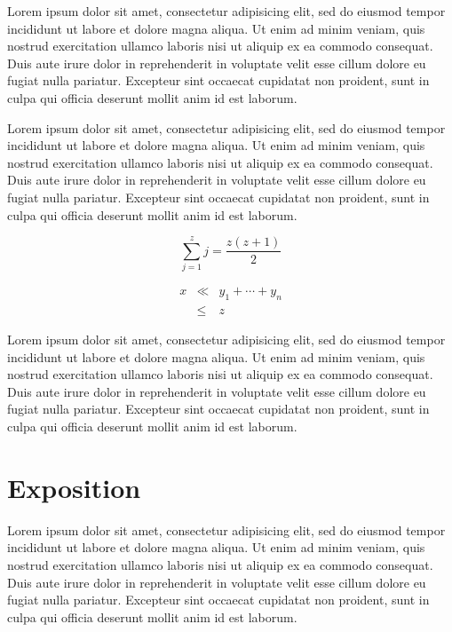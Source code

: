 \documentclass[annual]{acmsiggraph}
\begin{document}
Lorem ipsum dolor sit amet, consectetur adipisicing elit, sed do
eiusmod tempor incididunt ut labore et dolore magna aliqua. Ut enim ad
minim veniam, quis nostrud exercitation ullamco laboris nisi ut
aliquip ex ea commodo consequat. Duis aute irure dolor in
reprehenderit in voluptate velit esse cillum dolore eu fugiat nulla
pariatur. Excepteur sint occaecat cupidatat non proident, sunt in
culpa qui officia deserunt mollit anim id est laborum.

Lorem ipsum dolor sit amet, consectetur adipisicing elit, sed do
eiusmod tempor incididunt ut labore et dolore magna aliqua. Ut enim ad
minim veniam, quis nostrud exercitation ullamco laboris nisi ut
aliquip ex ea commodo consequat. Duis aute irure dolor in
reprehenderit in voluptate velit esse cillum dolore eu fugiat nulla
pariatur. Excepteur sint occaecat cupidatat non proident, sunt in
culpa qui officia deserunt mollit anim id est laborum.

\begin{equation}
 \sum_{j=1}^{z} j = \frac{z(z+1)}{2}
\end{equation}

\begin{eqnarray}
x & \ll & y_{1} + \cdots + y_{n} \\
  & \leq & z
\end{eqnarray}

Lorem ipsum dolor sit amet, consectetur adipisicing elit, sed do
eiusmod tempor incididunt ut labore et dolore magna aliqua. Ut enim ad
minim veniam, quis nostrud exercitation ullamco laboris nisi ut
aliquip ex ea commodo consequat. Duis aute irure dolor in
reprehenderit in voluptate velit esse cillum dolore eu fugiat nulla
pariatur. Excepteur sint occaecat cupidatat non proident, sunt in
culpa qui officia deserunt mollit anim id est laborum.

\section{Exposition}

Lorem ipsum dolor sit amet, consectetur adipisicing elit, sed do
eiusmod tempor incididunt ut labore et dolore magna aliqua. Ut enim ad
minim veniam, quis nostrud exercitation ullamco laboris nisi ut
aliquip ex ea commodo consequat. Duis aute irure dolor in
reprehenderit in voluptate velit esse cillum dolore eu fugiat nulla
pariatur. Excepteur sint occaecat cupidatat non proident, sunt in
culpa qui officia deserunt mollit anim id est laborum.
\end{document}
